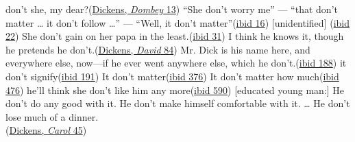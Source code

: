 \ea \label{ex:11-78}
\ea
don't she, my dear?\hfill(\href{https://archive.org/details/dombeyson00dick_0/page/28/mode/2up?q=%22don%27t+she%2C+my+dear%22&view=theater}{Dickens, \textit{Dombey} 13}) 
\ex
``She don't worry me'' --- ``that don't matter {\dots} it don't follow {\dots}'' --- ``Well, it don't matter''\hfill(\href{https://archive.org/details/dombeyson00dick_0/page/32/mode/2up?q=%22she+don%27t+worry+me%22&view=theater}{ibid 16}) 
\ex
{[}unidentified{]} \hfill(\href{}{ibid 22}) %
\ex
She don't gain on her papa in the least.\hfill(\href{https://archive.org/details/dombeyson00dick_0/page/56/mode/2up?q=%22don%27t+gain+on%22&view=theater}{ibid 31}) 
\ex
I think he knows it, though he pretends he don't.\hfill(\href{https://archive.org/details/personalhistory05dickgoog/page/n43/mode/2up?q=%22don%27t%22&view=theater}{Dickens, \textit{David} 84}) 
\ex
Mr. Dick is his name here, and everywhere else, now---if he ever went anywhere else, which he don't.\hfill(\href{https://archive.org/details/personalhistory05dickgoog/page/n87/mode/2up?q=%22mr.+dick+is+his%22&view=theater}{ibid 188}) 
\ex
it don't signify\hfill(\href{https://archive.org/details/personalhistory05dickgoog/page/n89/mode/2up?q=%22it+don%27t%22&view=theater}{ibid 191})
\ex
It don't matter\hfill(\href{https://archive.org/details/personalhistory05dickgoog/page/n89/mode/2up?q=%22it+don%27t%22&view=theater}{ibid 376})
\ex
It don't matter how much\hfill(\href{https://archive.org/details/personalhistory05dickgoog/page/n209/mode/2up?q=%22a+certain+property%22&view=theater}{ibid 476})
\ex
he'll think she don't like him any more\hfill(\href{https://archive.org/details/personalhistory05dickgoog/page/n259/mode/2up?q=%22he%27ll+think+she+don%27t%22&view=theater}{ibid 590}) 
\ex
{}[educated young man:] He don't do any good with it. He don't make himself comfortable with it. {\dots} He don't lose much of a dinner.\\\hfill(\href{https://archive.org/details/christmascarol0000char_h5c8/page/82/mode/2up?q=%22don%27t+do+any+good%22&view=theater}{Dickens, \textit{Carol} 45})
\z \z

